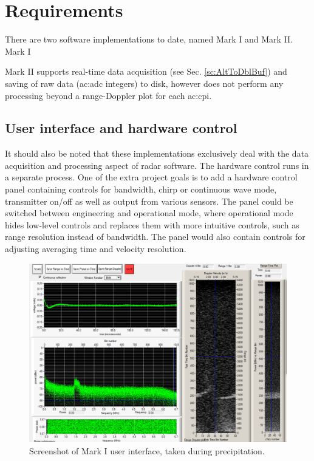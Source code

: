 \documentclass{article}
\begin{document}
\section{Requirements}
There are two software implementations to date, named Mark I and Mark II.
Mark I 

Mark II supports real-time data acquisition (see Sec. \ref{sc:AltToDblBuf}) and saving of raw data (\acrshort{ac:adc} integers) to disk, however does not perform any processing beyond a range-Doppler plot for each \acrshort{ac:cpi}. 

\subsection{User interface and hardware control}
It should also be noted that these implementations exclusively deal with the data acquisition and processing aspect of radar software. The hardware control runs in a separate process. One of the extra project goals is to add a hardware control panel containing controls for bandwidth, chirp or continuous wave mode, transmitter on/off as well as output from various sensors. The panel could be switched between engineering and operational mode, where operational mode hides low-level controls and replaces them with more intuitive controls, such as range resolution instead of bandwidth. The panel would also contain controls for adjusting averaging time and velocity resolution.

\begin{figure}
	\centering
	\includegraphics[width=\textwidth]{mark-1-rain}
	\caption{Screenshot of Mark I user interface, taken during precipitation.}
	\label{fig:Mark1Rain}
\end{figure}
\end{document}
